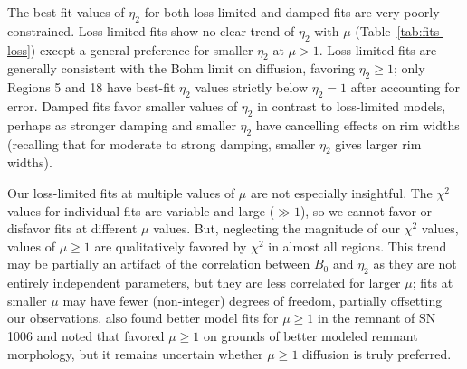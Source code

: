 \documentclass[manuscript]{aastex}  %
\newcommand*{\mt}{\mathrm}
\newcommand*{\unit}[1]{\;\mt{#1}}  %
\newcommand*{\Ecut}{E_{\mt{cut}}}
\newcommand*{\muG}{\unit{\mu G}}
\begin{document}

The best-fit values of $\eta_2$ for both loss-limited and damped fits are very
poorly constrained.  Loss-limited fits show no clear trend of $\eta_2$ with
$\mu$ (Table~\ref{tab:fits-loss}) except a general preference for smaller
$\eta_2$ at $\mu > 1$.  Loss-limited fits are generally consistent with the
Bohm limit on diffusion, favoring $\eta_2 \geq 1$; only Regions 5 and 18 have
best-fit $\eta_2$ values strictly below $\eta_2 = 1$ after accounting for
error.  Damped fits favor smaller values of $\eta_2$ in contrast to
loss-limited models, perhaps as stronger damping and smaller $\eta_2$ have
cancelling effects on rim widths (recalling that for moderate to strong
damping, smaller $\eta_2$ gives larger rim widths).

Our loss-limited fits at multiple values of $\mu$ are not especially
insightful.  The $\chi^2$ values for individual fits are variable and large
($\gg 1$), so we cannot favor or disfavor fits at different $\mu$ values.  But,
neglecting the magnitude of our $\chi^2$ values, values of $\mu \geq 1$ are
qualitatively favored by $\chi^2$ in almost all regions.  This trend may be
partially an artifact of the correlation between $B_0$ and $\eta_2$ as they are
not entirely independent parameters, but they are less correlated for larger
$\mu$; fits at smaller $\mu$ may have fewer (non-integer) degrees of freedom,
partially offsetting our observations.   also found
better model fits for $\mu \geq 1$ in the remnant of SN 1006 and noted that
\citet{reynolds2004} favored $\mu \geq 1$ on grounds of better modeled remnant
morphology, but it remains uncertain whether $\mu \geq 1$ diffusion is truly
preferred.
\end{document}
